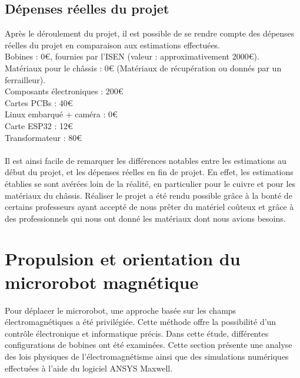 \documentclass{article}
\begin{document}
    \subsection{Dépenses réelles du projet}
        \noindent Après le déroulement du projet, il est possible de se rendre compte des dépenses réelles du projet en comparaison aux estimations effectuées.
        \\
        \tabto{1cm}Bobines : 0€, fournies par l'ISEN (valeur : approximativement 2000€).
        \\
        \tabto{1cm}Matériaux pour le châssis : 0€ (Matériaux de récupération ou donnés par un ferrailleur).
        \\
        \tabto{1cm}Composants électroniques : 200€
        \\
        \tabto{1cm}Cartes PCBs : 40€
        \\
        \tabto{1cm}Linux embarqué + caméra : 0€
        \\
        \tabto{1cm}Carte ESP32 : 12€
        \\
        \tabto{1cm}Transformateur : 80€
        \\\\
        Il est ainsi facile de remarquer les différences notables entre les estimations au début du projet, et les dépenses réelles en fin de projet. En effet, les estimations établies se sont avérées loin de la réalité, en particulier pour le cuivre et pour les matériaux du châssis. Réaliser le projet a été rendu possible grâce à la bonté de certains professeurs ayant accepté de nous prêter du matériel coûteux et grâce à des professionnels qui nous ont donné les matériaux dont nous avions besoins.
    

\section{Propulsion et orientation du microrobot magnétique}
    Pour déplacer le microrobot, une approche basée sur les champs électromagnétiques a été privilégiée. Cette méthode offre la possibilité d'un contrôle électronique et informatique précis. Dans cette étude, différentes configurations de bobines ont été examinées. Cette section présente une analyse des lois physiques de l'électromagnétisme ainsi que des simulations numériques effectuées à l'aide du logiciel ANSYS Maxwell.
\end{document}

